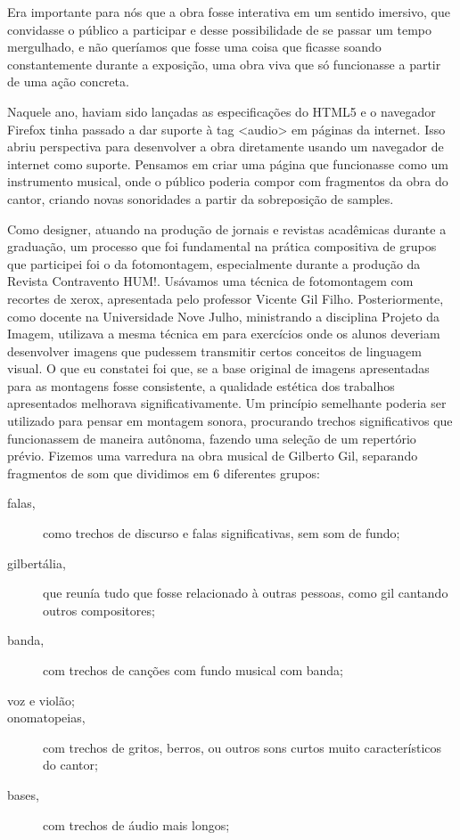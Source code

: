 Era importante para nós que a obra fosse interativa em um sentido imersivo, que convidasse o público a participar e desse possibilidade de se passar um tempo mergulhado, e não queríamos que fosse uma coisa que ficasse soando constantemente durante a exposição, uma obra viva que só funcionasse a partir de uma ação concreta. 

Naquele ano, haviam sido lançadas as especificações do HTML5 e o navegador Firefox tinha passado a dar suporte à tag <audio> em páginas da internet. Isso abriu perspectiva para desenvolver a obra diretamente usando um navegador de internet como suporte. Pensamos em criar uma página que funcionasse como um instrumento musical, onde o público poderia compor com fragmentos da obra do cantor, criando novas sonoridades a partir da sobreposição de samples. 

Como designer, atuando na produção de jornais e revistas acadêmicas durante a graduação, um processo que foi fundamental na prática compositiva de grupos que participei foi o da fotomontagem, especialmente durante a produção da Revista Contravento HUM!. Usávamos uma técnica de fotomontagem com recortes de xerox, apresentada pelo professor Vicente Gil Filho. Posteriormente, como docente na Universidade Nove Julho, ministrando a disciplina Projeto da Imagem, utilizava a mesma técnica em para exercícios onde os alunos deveriam desenvolver imagens que pudessem transmitir certos conceitos de linguagem visual. O que eu constatei foi que, se a base original de imagens apresentadas para as montagens fosse consistente, a qualidade estética dos trabalhos apresentados melhorava significativamente. Um princípio semelhante poderia ser utilizado para pensar em montagem sonora, procurando trechos significativos que funcionassem de maneira autônoma, fazendo uma seleção de um repertório prévio. Fizemos uma varredura na obra musical de Gilberto Gil, separando fragmentos de som que dividimos em 6 diferentes grupos: 

\begin{description}
\item[falas,]{ como trechos de discurso e falas significativas, sem som de fundo;
}
\item[gilbertália,]{ que reunía tudo que fosse relacionado à outras pessoas, como gil cantando outros compositores;
}
\item[banda,]{ com trechos de canções com fundo musical com banda;
}
\item[voz e violão;]{}
\item[onomatopeias,]{ com trechos de gritos, berros, ou outros sons curtos muito característicos do cantor;}
\item[bases,]{ com trechos de áudio mais longos; 
}

\end{description}


